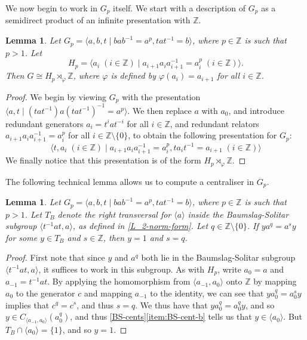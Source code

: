 \documentclass[11pt]{amsart}
\newtheorem{lem}[theorem]{Lemma}
\theoremstyle{definition}
\numberwithin{theorem}{section}
\newcommand{\Z}{\mathbb{Z}}
\begin{document}
We now begin to work in \(G_p\) itself. We start with a description of
\(G_p\) as a semidirect product of an infinite presentation with \(\Z\).

\begin{lem}
	\label{inf-pres}
	Let \(G_p = \langle a, b, t \mid bab^{-1} = a^p, tat^{-1} = b\rangle\), where
	\(p \in \Z\) is such that \(p > 1\). Let
	\[
	 H_p = 
			\langle a_i \; (i \in \Z) \mid a_{i + 1} a_i
	a_{i + 1}^{-1} = a_i^p \; (i \in \Z)\rangle.
	\]
	Then \(G \cong H_p \rtimes_\varphi \Z\), where \(\varphi\) is defined by
	\(\varphi(a_i) = a_{i + 1}\) for all \(i \in \Z\).
\end{lem}

\begin{proof}
	 We begin by viewing \(G_p\) with the presentation \(\langle a, t \mid
	 (tat^{-1}) a (tat^{-1})^{-1} = a^p \rangle\). We then replace \(a\) with
	 \(a_0\), and introduce redundant generators \(a_i = t^i a t^{-i}\) for all
	 \(i \in \Z\), and redundant relators \(a_{i + 1} a_i a_{i + 1}^{-1} =
	 a_i^p\) for all \(i \in \Z \setminus \{0\}\), to obtain the following
	 presentation for \(G_p\):
	\[
		\langle t, a_i \; (i \in \Z) \mid a_{i + 1} a_i
		a_{i + 1}^{-1} = a_i^p, t a_i t^{-1} = a_{i + 1} \; (i \in \Z)\rangle
\]
	 We finally notice that this presentation is of the form \(H_p \rtimes_\varphi \Z\).
\end{proof}

The following technical lemma allows us to compute a centraliser in \(G_p\).
\begin{lem}
	\label{pre-cents}
	Let \(G_p = \langle a, b, t \mid bab^{-1} = a^p, tat^{-1} = b\rangle\),
	where \(p \in \Z\) is such that \(p > 1\). Let \(T_B\) denote
	the right transversal for \(\langle a \rangle\) inside the Baumslag-Solitar subgroup \(\langle t^{-1} a t , a\rangle\),
	as defined in \cref{L_2-norm-form}. Let \(q \in \Z \setminus
	\{0\}\).  If \(y a^q = a^s y\) for some \(y \in T_B\) and \(s \in \Z\),
	then \(y = 1\) and \(s = q\).
\end{lem}

\begin{proof}
	First note that since \(y\) and \(a^q\) both lie in the Baumslag-Solitar
	subgroup \(\langle t^{-1} a t, a \rangle\), it suffices to work in this
	subgroup. As with \(H_p\), write \(a_0 = a\) and \(a_{-1} = t^{-1} a t\).
	By applying the homomorphism from \(\langle a_{-1}, a_0 \rangle\)
	onto \(\Z\) by mapping \(a_0\) to the generator \(c\) and mapping
	\(a_{-1}\) to the identity, we can see that
	\(ya_0^q = a_0^s y\) implies that \(c^q = c^s\), and thus
	\(s = q\). We thus have that \(y a_0^q = a_0^q y\), and so
	\(y \in C_{\langle a_{-1}, a_0 \rangle}(a_0^q)\),
	and thus \cref{BS-cents}\eqref{item:BS-cent-b} tells us that
	\(y \in \langle a_0 \rangle\). But \(T_B \cap \langle a_0 \rangle
	= \{1\}\), and so \(y = 1\).
\end{proof}
\end{document}

